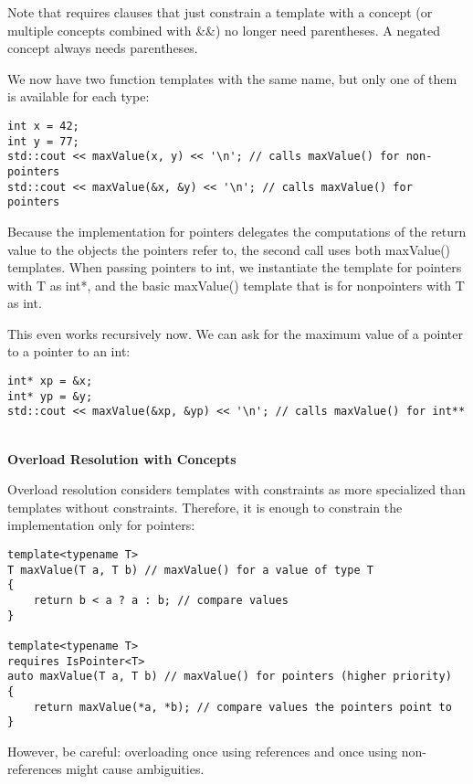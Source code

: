 Note that requires clauses that just constrain a template with a concept (or multiple concepts combined with \&\&) no longer need parentheses. A negated concept always needs parentheses.

We now have two function templates with the same name, but only one of them is available for each type:

\begin{lstlisting}[style=styleCXX]
int x = 42;
int y = 77;
std::cout << maxValue(x, y) << '\n'; // calls maxValue() for non-pointers
std::cout << maxValue(&x, &y) << '\n'; // calls maxValue() for pointers
\end{lstlisting}

Because the implementation for pointers delegates the computations of the return value to the objects the pointers refer to, the second call uses both maxValue() templates. When passing pointers to int, we instantiate the template for pointers with T as int*, and the basic maxValue() template that is for nonpointers with T as int.

This even works recursively now. We can ask for the maximum value of a pointer to a pointer to an int:

\begin{lstlisting}[style=styleCXX]
int* xp = &x;
int* yp = &y;
std::cout << maxValue(&xp, &yp) << '\n'; // calls maxValue() for int**
\end{lstlisting}

\noindent
\hspace*{\fill} \\ %
\textbf{Overload Resolution with Concepts}

Overload resolution considers templates with constraints as more specialized than templates without constraints. Therefore, it is enough to constrain the implementation only for pointers:

\begin{lstlisting}[style=styleCXX]
template<typename T>
T maxValue(T a, T b) // maxValue() for a value of type T
{
	return b < a ? a : b; // compare values
}

template<typename T>
requires IsPointer<T>
auto maxValue(T a, T b) // maxValue() for pointers (higher priority)
{
	return maxValue(*a, *b); // compare values the pointers point to
}
\end{lstlisting}

However, be careful: overloading once using references and once using non-references might cause ambiguities.

